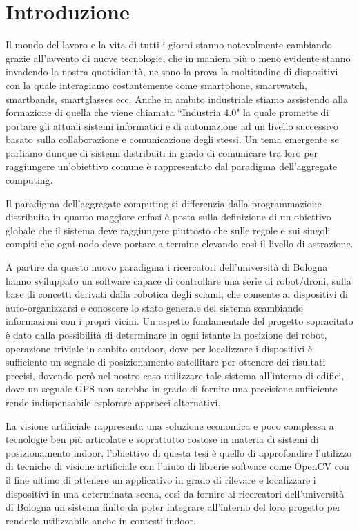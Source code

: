 \documentclass[12pt,a4paper,openright,twoside]{book}
\begin{document}
\mainmatter

\chapter{Introduzione}
Il mondo del lavoro e la vita di tutti i giorni stanno notevolmente cambiando grazie all'avvento di nuove tecnologie, che in maniera più o meno evidente stanno invadendo la nostra quotidianità, ne sono la prova la moltitudine di dispositivi con la quale interagiamo costantemente come smartphone, smartwatch, smartbands, smartglasses ecc.
Anche in ambito industriale stiamo assistendo alla formazione di quella che viene chiamata ``Industria 4.0" la quale promette di portare gli attuali sistemi informatici e di automazione ad un livello successivo basato sulla collaborazione e comunicazione degli stessi.
Un tema emergente se parliamo dunque di sistemi distribuiti in grado di comunicare tra loro per raggiungere un'obiettivo comune è rappresentato dal paradigma dell'aggregate computing.

Il paradigma dell'aggregate computing si differenzia dalla programmazione distribuita in quanto maggiore enfasi è posta sulla definizione di un obiettivo globale che il sistema deve raggiungere piuttosto che sulle regole e sui singoli compiti che ogni nodo deve portare a termine elevando così il livello di astrazione.

A partire da questo nuovo paradigma i ricercatori dell'università di Bologna hanno sviluppato un software capace di controllare una serie di robot/droni, sulla base di concetti derivati dalla robotica degli sciami, che consente ai dispositivi di auto-organizzarsi e conoscere lo stato generale del sistema scambiando informazioni con i propri vicini.
Un aspetto fondamentale del progetto sopracitato è dato dalla possibilità di determinare in ogni istante la posizione dei robot, operazione triviale in ambito outdoor, dove per localizzare i dispositivi è sufficiente un segnale di posizionamento satellitare per ottenere dei risultati precisi, dovendo però nel nostro caso utilizzare tale sistema all'interno di edifici, dove un segnale GPS non sarebbe in grado di fornire una precisione sufficiente rende indispensabile esplorare approcci alternativi.

La visione artificiale rappresenta una soluzione economica e poco complessa a tecnologie ben più articolate e soprattutto costose in materia di sistemi di posizionamento indoor, l'obiettivo di questa tesi è quello di approfondire l'utilizzo di tecniche di visione artificiale con l'aiuto di librerie software come OpenCV con il fine ultimo di ottenere un applicativo in grado di rilevare e localizzare i dispositivi in una determinata scena, così da fornire ai ricercatori dell'università di Bologna un sistema finito da poter integrare all'interno del loro progetto per renderlo utilizzabile anche in contesti indoor.
\end{document}
